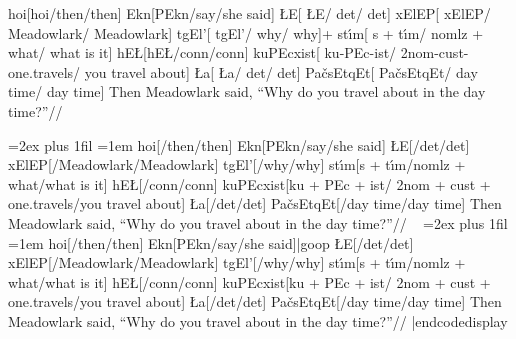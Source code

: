\ex[extraglskip=2ex,aboveglftskip=2ex]
\begingl
hoi[hoi/then/then]
Ekn[{\mroot}PEkn/{\mroot}say/{she said}]
{\L}E[ {\L}E/ det/ det]
{x\W}ElEP[ {x\W}ElEP/ Meadowlark/ Meadowlark]
t{g\W}El'[ t{g\W}El'/ why/ why]+
st{\'\i}m[ {s + \mroot t\'\i m}/ {nomlz + \mroot what}/ {what is it}]
{hE\L}[{hE\L}/conn/conn]
{kuPEcx\W ist}[ ku-PEc-ist/ 2nom-cust-{\mroot}one.travels/ {you travel about}]
{\L a}[ {\L}a/ det/ det]
Pa{\v c}sEtqEt[ Pa{\v c}sEtqEt/ day time/ day time]
\endilg
\glft Then Meadowlark said, ``Why do you travel about in the day
   time?''//
\endgl
\xe


\framedisplay
\ex[glstyle=nlevel,glneveryline={\ips,\ips},glnabovelineextraskip={,,.5ex},
   abovemoreglskip=1ex,glspace=2em]
\lineskip=2ex
\rightskip=0pt plus 1fil
\hangindent=1em
\begingl
hoi[/then/then]
Ekn[{\mroot}PEkn/{\mroot}say/{she said}]
{\L}E[/\sc det/\sc det]
{x\W}ElEP[/Meadowlark/Meadowlark]
t{g\W}El'[/why/why]
st{\'\i}m[{s {\rm +} \mroot t\'\i m}/{{\sc nomlz} + \mroot what}/{what is it}]
{hE\L}[/\sc conn/\sc conn]
{kuPEcx\W ist}[{ku {\rm +} PEc {\rm +} ist}/%
   {{\sc 2nom} + {\sc cust} + {\mroot}one.travels}/{you travel about}]
{\L a}[/\sc det/\sc det]
Pa{\v c}sEtqEt[/{day time}/{day time}]
\endilg
\glft Then Meadowlark said, ``Why do you travel about in the day
   time?''//
\endgl
\xe
\endframedisplay
\def\goop{\thinspace\putfnno}%
\codedisplay~
\ex[glstyle=nlevel, glneveryline={\ips,\ips},
   glnabovelineextraskip={,,.5ex}, abovemoreglskip=1ex, glspace=2em]
\lineskip=2ex
\rightskip=0pt plus 1fil
\hangindent=1em
\begingl
hoi[/then/then]
Ekn[{\mroot}PEkn/{\mroot}say/{she said}]|goop
{\L}E[/\sc det/\sc det]
{x\W}ElEP[/Meadowlark/Meadowlark]
t{g\W}El'[/why/why]
st{\'\i}m[{s {\rm +} \mroot t\'\i m}/{{\sc nomlz} + \mroot what}/{what is it}]
{hE\L}[/\sc conn/\sc conn]
{kuPEcx\W ist}[{ku {\rm +} PEc {\rm +} ist}/%
   {{\sc 2nom} + {\sc cust} + {\mroot}one.travels}/{you travel about}]
{\L a}[/\sc det/\sc det]
Pa{\v c}sEtqEt[/{day time}/{day time}]
\endilg
\glft Then Meadowlark said, ``Why do you travel about in the day
   time?''//
\endgl
\xe
|endcodedisplay


\endinput


